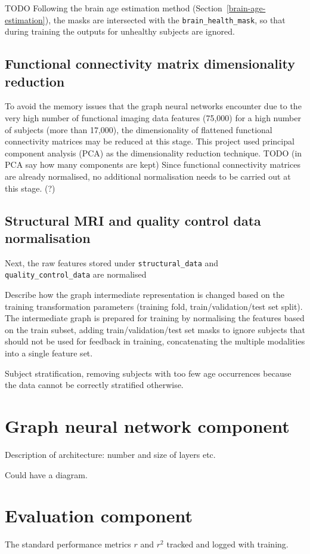 TODO Following the brain age estimation method (Section~\ref{brain-age-estimation}), the masks are intersected with the \texttt{brain\_health\_mask}, so that during training the outputs for unhealthy subjects are ignored. 

\subsection{Functional connectivity matrix dimensionality reduction}
To avoid the memory issues that the graph neural networks encounter due to the very high number of functional imaging data features (75,000) for a high number of subjects (more than 17,000), the dimensionality of flattened functional connectivity matrices may be reduced at this stage. This project used principal component analysis (PCA) as the dimensionality reduction technique. 
TODO (in PCA say how many components are kept)
Since functional connectivity matrices are already normalised, no additional normalisation needs to be carried out at this stage. (?)

\subsection{Structural MRI and quality control data normalisation}
Next, the raw features stored under \texttt{structural\_data} and \texttt{quality\_control\_data} are normalised 



Describe how the graph intermediate representation is changed based on the training transformation parameters (training fold, train/validation/test set split). The intermediate graph is prepared for training by normalising the features based on the train subset, adding train/validation/test set masks to ignore subjects that should not be used for feedback in training, concatenating the multiple modalities into a single feature set.

Subject stratification, removing subjects with too few age occurrences because the data cannot be correctly stratified otherwise.


\section{Graph neural network component}
Description of architecture: number and size of layers etc.

Could have a diagram.


\section{Evaluation component}
The standard performance metrics $r$ and $r^2$ tracked and logged with training.

